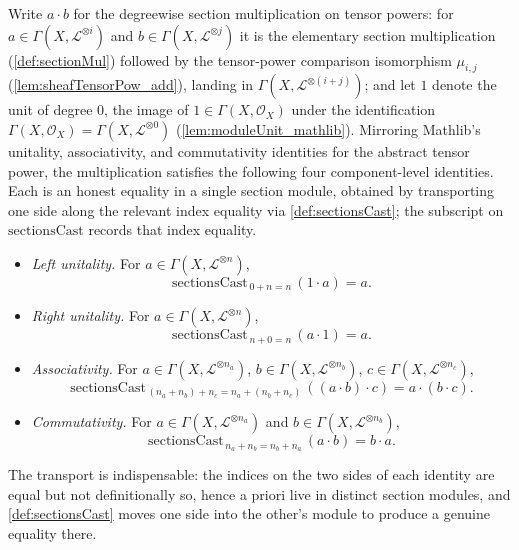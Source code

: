 \begin{lemma}
  \label{lem:sectionMul_coherent}
  Write \(a \cdot b\) for the degreewise section multiplication on tensor powers:
  for \(a \in \Gamma(X, \mathcal{L}^{\otimes i})\) and
  \(b \in \Gamma(X, \mathcal{L}^{\otimes j})\) it is the elementary section
  multiplication (\cref{def:sectionMul}) followed by the tensor-power comparison
  isomorphism \(\mu_{i,j}\) (\cref{lem:sheafTensorPow_add}), landing in
  \(\Gamma(X, \mathcal{L}^{\otimes (i+j)})\); and let \(1\) denote the unit of
  degree \(0\), the image of \(1 \in \Gamma(X,\mathcal{O}_X)\) under the
  identification \(\Gamma(X,\mathcal{O}_X) = \Gamma(X, \mathcal{L}^{\otimes 0})\)
  (\cref{lem:moduleUnit_mathlib}). Mirroring Mathlib's unitality, associativity,
  and commutativity identities for the abstract tensor power, the multiplication
  satisfies the following four component-level identities. Each is
  an honest equality in a single section module, obtained by transporting one side
  along the relevant index equality via \cref{def:sectionsCast}; the subscript on
  \(\mathrm{sectionsCast}\) records that index equality.
  \begin{itemize}
    \item \emph{Left unitality.} For \(a \in \Gamma(X, \mathcal{L}^{\otimes n})\),
      \[
        \mathrm{sectionsCast}_{\,0+n=n}\,(1 \cdot a) = a .
      \]
    \item \emph{Right unitality.} For \(a \in \Gamma(X, \mathcal{L}^{\otimes n})\),
      \[
        \mathrm{sectionsCast}_{\,n+0=n}\,(a \cdot 1) = a .
      \]
    \item \emph{Associativity.} For
      \(a \in \Gamma(X, \mathcal{L}^{\otimes n_a})\),
      \(b \in \Gamma(X, \mathcal{L}^{\otimes n_b})\),
      \(c \in \Gamma(X, \mathcal{L}^{\otimes n_c})\),
      \[
        \mathrm{sectionsCast}_{\,(n_a+n_b)+n_c = n_a+(n_b+n_c)}\,
          ((a \cdot b) \cdot c) = a \cdot (b \cdot c) .
      \]
    \item \emph{Commutativity.} For
      \(a \in \Gamma(X, \mathcal{L}^{\otimes n_a})\) and
      \(b \in \Gamma(X, \mathcal{L}^{\otimes n_b})\),
      \[
        \mathrm{sectionsCast}_{\,n_a+n_b = n_b+n_a}\,(a \cdot b) = b \cdot a .
      \]
  \end{itemize}
  The transport is indispensable: the indices on the two sides of each identity
  are equal but not definitionally so, hence a priori live in distinct section
  modules, and \cref{def:sectionsCast} moves one side into the other's module to
  produce a genuine equality there.
\end{lemma}

